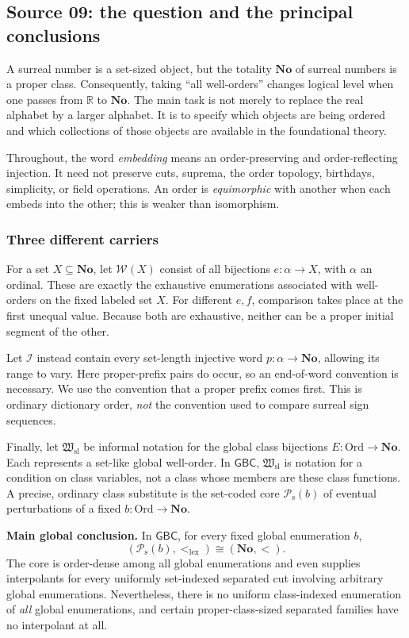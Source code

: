 \documentclass[11pt]{article}
\theoremstyle{definition}
\theoremstyle{remark}
\newcommand{\No}{\mathbf{No}}
\newcommand{\Ord}{\mathrm{Ord}}
\newcommand{\WO}{\mathcal W}
\newcommand{\Words}{\mathcal I}
\newcommand{\Hsl}{\mathfrak W_{\mathrm{sl}}}
\newcommand{\Psupp}{\mathcal P_{\mathrm{s}}}
\newcommand{\lex}{\mathrm{lex}}
\newcommand{\GBC}{\mathsf{GBC}}
\begin{document}
\subsection{Source 09: the question and the principal conclusions}
\label{swo:ec:sec:intro}
A surreal number is a set-sized object, but the totality $\No$ of surreal
numbers is a proper class. Consequently, taking ``all well-orders'' changes
logical level when one passes from $\mathbb R$ to $\No$. The main task is
not merely to replace the real alphabet by a larger alphabet. It is to
specify which objects are being ordered and which collections of those
objects are available in the foundational theory.

Throughout, the word \emph{embedding} means an order-preserving and
order-reflecting injection. It need not preserve cuts, suprema, the order
topology, birthdays, simplicity, or field operations. An order is
\emph{equimorphic} with another when each embeds into the other; this is
weaker than isomorphism.

\subsubsection{Three different carriers}
For a set $X\subseteq\No$, let $\WO(X)$ consist of all bijections
$e:\alpha\to X$, with $\alpha$ an ordinal. These are exactly the exhaustive
enumerations associated with well-orders on the fixed labeled set $X$.
For different $e,f$, comparison takes place at the first unequal value.
Because both are exhaustive, neither can be a proper initial segment of
the other.

Let $\Words$ instead contain every set-length injective word
$p:\alpha\to\No$, allowing its range to vary. Here proper-prefix pairs do
occur, so an end-of-word convention is necessary. We use the convention
that a proper prefix comes first. This is ordinary dictionary order,
\emph{not} the convention used to compare surreal sign sequences.

Finally, let $\Hsl$ be informal notation for the global class bijections
$E:\Ord\to\No$. Each represents a set-like global well-order. In
$\GBC$, $\Hsl$ is notation for a condition on class variables, not a class
whose members are these class functions. A precise, ordinary class
substitute is the set-coded core $\Psupp(b)$ of eventual perturbations of a
fixed $b:\Ord\to\No$.

\begin{resultbox}
\textbf{Main global conclusion.}
In $\GBC$, for every fixed global enumeration $b$,
\[
                 (\Psupp(b),<_{\lex})\cong(\No,<).
\]
The core is order-dense among all global enumerations and even supplies
interpolants for every uniformly set-indexed separated cut involving
arbitrary global enumerations. Nevertheless, there is no uniform
class-indexed enumeration of \emph{all} global enumerations, and certain
proper-class-sized separated families have no interpolant at all.
\end{resultbox}
\end{document}
